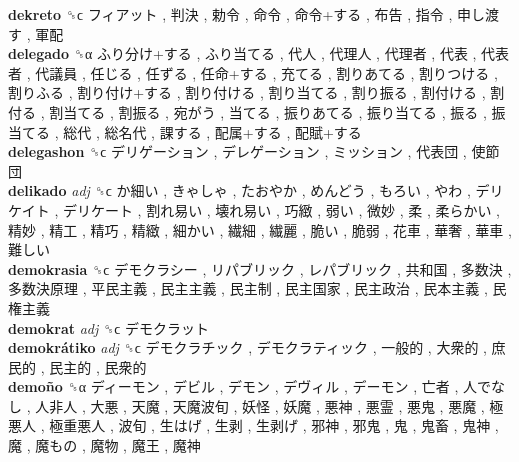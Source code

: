 \textbf{dekreto} ␝ϲ   フィアット ,  判決 ,  勅令 ,  命令 ,  命令+する ,  布告 ,  指令 ,  申し渡す ,  軍配   \\
\textbf{delegado} ␝α   ふり分け+する ,  ふり当てる ,  代人 ,  代理人 ,  代理者 ,  代表 ,  代表者 ,  代議員 ,  任じる ,  任ずる ,  任命+する ,  充てる ,  割りあてる ,  割りつける ,  割りふる ,  割り付け+する ,  割り付ける ,  割り当てる ,  割り振る ,  割付ける ,  割付る ,  割当てる ,  割振る ,  宛がう ,  当てる ,  振りあてる ,  振り当てる ,  振る ,  振当てる ,  総代 ,  総名代 ,  課する ,  配属+する ,  配賦+する   \\
\textbf{delegashon} ␝ϲ   デリゲーション ,  デレゲーション ,  ミッション ,  代表団 ,  使節団   \\
\textbf{delikado} \emph{adj}  ␝ϲ   か細い ,  きゃしゃ ,  たおやか ,  めんどう ,  もろい ,  やわ ,  デリケイト ,  デリケート ,  割れ易い ,  壊れ易い ,  巧緻 ,  弱い ,  微妙 ,  柔 ,  柔らかい ,  精妙 ,  精工 ,  精巧 ,  精緻 ,  細かい ,  繊細 ,  繊麗 ,  脆い ,  脆弱 ,  花車 ,  華奢 ,  華車 ,  難しい   \\
\textbf{demokrasia} ␝ϲ   デモクラシー ,  リパブリック ,  レパブリック ,  共和国 ,  多数決 ,  多数決原理 ,  平民主義 ,  民主主義 ,  民主制 ,  民主国家 ,  民主政治 ,  民本主義 ,  民権主義   \\
\textbf{demokrat} \emph{adj}  ␝ϲ   デモクラット   \\
\textbf{demokrátiko} \emph{adj}  ␝ϲ   デモクラチック ,  デモクラティック ,  一般的 ,  大衆的 ,  庶民的 ,  民主的 ,  民衆的   \\
\textbf{demoño} ␝α   ディーモン ,  デビル ,  デモン ,  デヴィル ,  デーモン ,  亡者 ,  人でなし ,  人非人 ,  大悪 ,  天魔 ,  天魔波旬 ,  妖怪 ,  妖魔 ,  悪神 ,  悪霊 ,  悪鬼 ,  悪魔 ,  極悪人 ,  極重悪人 ,  波旬 ,  生はげ ,  生剥 ,  生剥げ ,  邪神 ,  邪鬼 ,  鬼 ,  鬼畜 ,  鬼神 ,  魔 ,  魔もの ,  魔物 ,  魔王 ,  魔神   \\
